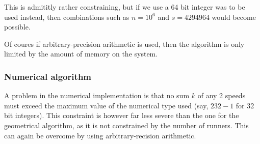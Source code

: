 This is admititly rather constraining, but if we use a 64 bit integer was to be used instead, then combinations such as $n = 10^6$ and $s = 4294964$ would become possible.

Of coures if arbitrary-precision arithmetic is used, then the algorithm is only limited by the amount of memory on the system.

\subsubsection{Numerical algorithm}
A problem in the numerical implementation is that no sum $k$ of any 2 speeds must exceed the maximum value of the numerical type used (say, $2 {32} - 1$ for 32 bit integers). This constraint is however far less severe than the one for the geometrical algorithm, as it is not constrained by the number of runners. This can again be overcome by using arbitrary-recision arithmetic.
